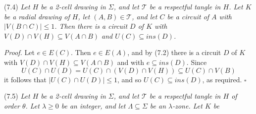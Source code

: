 \stmt
(7.4) \textit{Let $H$ be a 2-cell drawing in $\Sigma$, and let $\mathscr{T}$ be a respectful tangle in $H$. Let $K$ be a radial drawing of $H$, let $(A, B) \in \mathscr{T}$, and let $C$ be a circuit of $A$ with $|V(B \cap C)| \le 1$. Then there is a circuit $D$ of $K$ with $V(D) \cap V(H) \subseteq V(A \cap B)$ and $U(C) \subseteq ins(D)$.}

\textit{Proof.} Let $e \in E(C)$. Then $e \in E(A)$, and by (7.2) there is a circuit $D$ of $K$ with $V(D) \cap V(H) \subseteq V(A \cap B)$ and with $e \subseteq ins(D)$. Since
\begin{equation*}
U(C) \cap U(D) = U(C) \cap (V(D) \cap V(H)) \subseteq U(C) \cap V(B)
\end{equation*}
it follows that $|U(C) \cap U(D)| \le 1$, and so $U(C) \subseteq ins(D)$, as required. $\square$

\stmt
(7.5) \textit{Let $H$ be a 2-cell drawing in $\Sigma$, and let $\mathscr{T}$ be a respectful tangle in $H$ of order $\theta$. Let $\lambda \ge 0$ be an integer, and let $\Lambda \subseteq \Sigma$ be an $\lambda$-zone. Let $K$ be}
